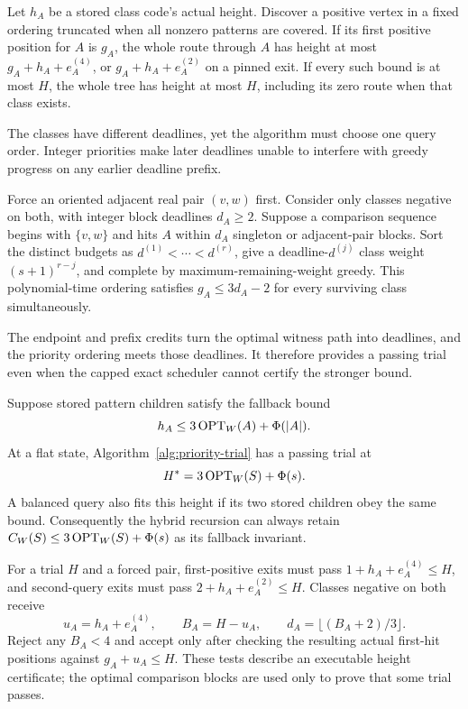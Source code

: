 \begin{proposition}\label{lem:worst-local-height}
Let $h_A$ be a stored class code's actual height. Discover a positive
vertex in a fixed ordering truncated when all nonzero patterns are
covered. If its first positive position for $A$ is $g_A$, the whole
route through $A$ has height at most $g_A+h_A+e_A^{(4)}$, or
$g_A+h_A+e_A^{(2)}$ on a pinned exit. If every such bound is at most
$H$, the whole tree has height at most $H$, including its zero route
when that class exists.
\end{proposition}

The classes have different deadlines, yet the algorithm must choose
one query order. Integer priorities make later deadlines unable to
interfere with greedy progress on any earlier deadline prefix.

\begin{proposition}
\label{lem:deadline-cover}
Force an oriented adjacent real pair $(v,w)$ first. Consider only
classes negative on both, with integer block deadlines $d_A\ge2$.
Suppose a comparison sequence begins with $\{v,w\}$ and hits $A$
within $d_A$ singleton or adjacent-pair blocks. Sort the distinct
budgets as $d^{(1)}<\cdots<d^{(r)}$, give a deadline-$d^{(j)}$ class
weight $(s+1)^{r-j}$, and complete by maximum-remaining-weight greedy.
This polynomial-time ordering satisfies $g_A\le3d_A-2$
for every surviving class simultaneously.
\end{proposition}

The endpoint and prefix credits turn the optimal witness path into
deadlines, and the priority ordering meets those deadlines. It therefore
provides a passing trial even when the capped exact scheduler cannot
certify the stronger bound.

\begin{proposition}
\label{thm:worst}
Suppose stored pattern children satisfy the fallback bound
\[
h_A\le3\operatorname{OPT}_W(A)+\Phi(|A|).
\]
At a flat state,
Algorithm~\ref{alg:priority-trial} has a passing trial at
\[
 H^*=3\operatorname{OPT}_W(S)+\Phi(s).
\]
A balanced query also fits this height if its two stored children
obey the same bound. Consequently the hybrid recursion can always
retain $C_W(S)\le3\operatorname{OPT}_W(S)+\Phi(s)$ as its fallback invariant.
\end{proposition}

For a trial $H$ and a forced pair, first-positive exits must pass
$1+h_A+e_A^{(4)}\le H$, and second-query exits must pass
$2+h_A+e_A^{(2)}\le H$. Classes negative on both receive
\[
 u_A=h_A+e_A^{(4)},\qquad B_A=H-u_A,\qquad
 d_A=\lfloor(B_A+2)/3\rfloor.
\]
Reject any $B_A<4$ and accept only after checking the resulting
actual first-hit positions against $g_A+u_A\le H$.
These tests describe an executable height certificate; the optimal
comparison blocks are used only to prove that some trial passes.

